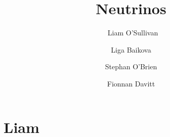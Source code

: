 \documentclass[10pt]{report}
\title{Neutrinos}
\author{\
    Liam O'Sullivan \and
    Liga Baikova \and
    Stephan O'Brien \and
    Fionnan Davitt
}
\begin{document}
\maketitle

\tableofcontents

\chapter{Liam}

\end{document}
